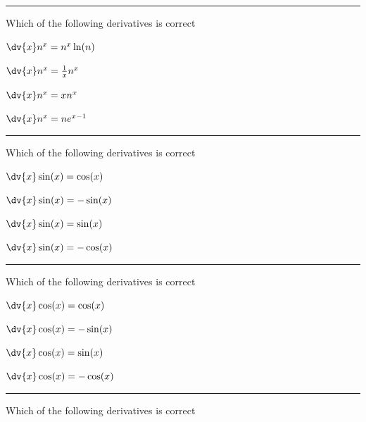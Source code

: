 \begin{preguntas}
\pregunta[4] \rule{1cm}{0.1mm} Which of the following derivatives is correct

\begin{enumerate*}[label=(\alph*)]
    \item \(\dv{x}n^{x} = n^{x}\ln(n)\)\hspace{2em}
    \item \(\dv{x}n^{x} = \frac{1}{x}n^{x}\)\hspace{2em}
    \item \(\dv{x}n^{x} = xn^{x}\) \hspace{2em}
    \item \(\dv{x}n^{x} = ne^{x-1}\)
\end{enumerate*}

\pregunta[4] \rule{1cm}{0.1mm} Which of the following derivatives is correct

\begin{enumerate*}[label=(\alph*)]
    \item \(\dv{x}\sin(x) = \cos(x)\) \hspace{2em}
    \item \(\dv{x}\sin(x) = -\sin(x)\)\hspace{2em}
    \item \(\dv{x}\sin(x) = \sin(x)\)\hspace{2em}
    \item \(\dv{x}\sin(x) = -\cos(x)\)
\end{enumerate*}

\pregunta[4] \rule{1cm}{0.1mm} Which of the following derivatives is correct

\begin{enumerate*}[label=(\alph*)]
    \item \(\dv{x}\cos(x) = \cos(x)\) \hspace{2em}
    \item \(\dv{x}\cos(x) = -\sin(x)\)\hspace{2em}
    \item \(\dv{x}\cos(x) = \sin(x)\)\hspace{2em}
    \item \(\dv{x}\cos(x) = -\cos(x)\)
\end{enumerate*}

\pregunta[4] \rule{1cm}{0.1mm} Which of the following derivatives is correct


\end{preguntas}
